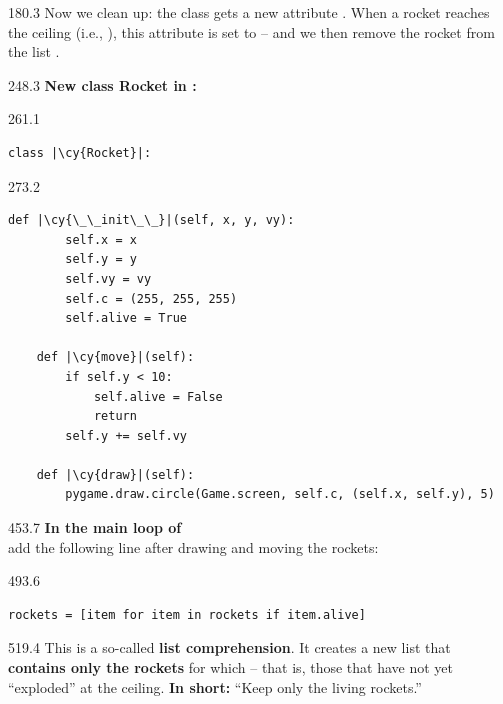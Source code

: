 \documentclass{aslab}
\newcommand*\codemd[1]{{\mdseries\codearg{#1}}}
\newcommand*\cy[1]{\textcolor{codecyan}{#1}}
\begin{document}
\begin{region}[pitch=13.53]{180.3}
Now we clean up: the class  gets a new attribute .
When a rocket reaches the ceiling (i.e., ), this attribute is set
to  -- and we then remove the rocket from the list
.
\end{region}

\begin{region}{248.3}
\textbf{New class Rocket in \codemd{rocket.py}:}
\end{region}

\begin{region}{261.1}
\begin{lstlisting}[style=pysmall]
class |\cy{Rocket}|:
\end{lstlisting}
\end{region}

\begin{region}[pitch=11]{273.2}
\begin{lstlisting}[style=pysmall]
    def |\cy{\_\_init\_\_}|(self, x, y, vy):
        self.x = x
        self.y = y
        self.vy = vy
        self.c = (255, 255, 255)
        self.alive = True

    def |\cy{move}|(self):
        if self.y < 10:
            self.alive = False
            return
        self.y += self.vy

    def |\cy{draw}|(self):
        pygame.draw.circle(Game.screen, self.c, (self.x, self.y), 5)
\end{lstlisting}
\end{region}

\begin{region}[pitch=13.3]{453.7}
\textbf{In the main loop of \codemd{breakout.py}}\\
add the following line after drawing and moving the rockets:
\end{region}

\begin{region}{493.6}
\begin{lstlisting}[style=py]
    rockets = [item for item in rockets if item.alive]
\end{lstlisting}
\end{region}

\begin{region}[pitch=14.3]{519.4}
This is a so-called \textbf{list comprehension}. It creates a new list that
\textbf{contains only the rockets} for which  -- that is,
those that have not yet ``exploded'' at the ceiling. \textbf{In short:}
``Keep only the living rockets.''
\end{region}
\end{document}
